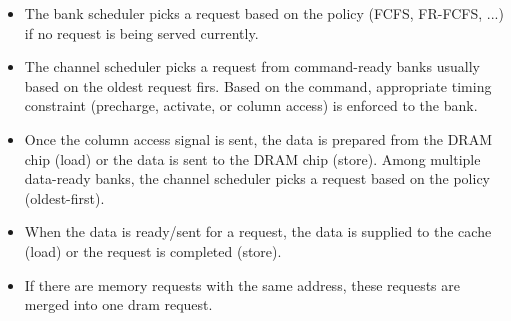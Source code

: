 \begin{itemize}
  \item The bank scheduler picks a request based on the policy (FCFS,
    FR-FCFS, ...) if no request is being served currently.

  \item The channel scheduler picks a request from command-ready banks
    usually based on the oldest request firs. Based on the command,
    appropriate timing constraint (precharge, activate, or column
    access) is enforced to the bank.

  \item Once the column access signal is sent, the data is prepared
  from the DRAM chip (load) or the data is sent to the DRAM chip
  (store). Among multiple data-ready banks, the channel scheduler
  picks a request based on the policy (oldest-first).

  \item When the data is ready/sent for a request, the data is
  supplied to the cache (load) or the request is completed (store).

  \item If there are memory requests with the same address, these
  requests are merged into one dram request. 

\end{itemize}




